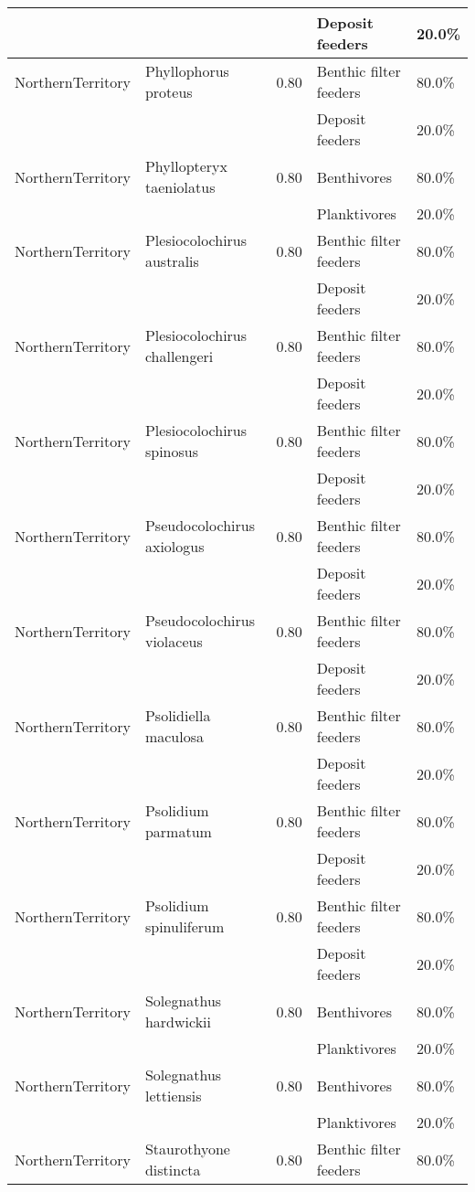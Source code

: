 \begin{longtable}{llcll}
& & & Deposit feeders & 20.0\% \\
\hline
NorthernTerritory & Phyllophorus proteus & 0.80 & Benthic filter feeders & 80.0\% \\
& & & Deposit feeders & 20.0\% \\
\hline
NorthernTerritory & Phyllopteryx taeniolatus & 0.80 & Benthivores & 80.0\% \\
& & & Planktivores & 20.0\% \\
\hline
NorthernTerritory & Plesiocolochirus australis & 0.80 & Benthic filter feeders & 80.0\% \\
& & & Deposit feeders & 20.0\% \\
\hline
NorthernTerritory & Plesiocolochirus challengeri & 0.80 & Benthic filter feeders & 80.0\% \\
& & & Deposit feeders & 20.0\% \\
\hline
NorthernTerritory & Plesiocolochirus spinosus & 0.80 & Benthic filter feeders & 80.0\% \\
& & & Deposit feeders & 20.0\% \\
\hline
NorthernTerritory & Pseudocolochirus axiologus & 0.80 & Benthic filter feeders & 80.0\% \\
& & & Deposit feeders & 20.0\% \\
\hline
NorthernTerritory & Pseudocolochirus violaceus & 0.80 & Benthic filter feeders & 80.0\% \\
& & & Deposit feeders & 20.0\% \\
\hline
NorthernTerritory & Psolidiella maculosa & 0.80 & Benthic filter feeders & 80.0\% \\
& & & Deposit feeders & 20.0\% \\
\hline
NorthernTerritory & Psolidium parmatum & 0.80 & Benthic filter feeders & 80.0\% \\
& & & Deposit feeders & 20.0\% \\
\hline
NorthernTerritory & Psolidium spinuliferum & 0.80 & Benthic filter feeders & 80.0\% \\
& & & Deposit feeders & 20.0\% \\
\hline
NorthernTerritory & Solegnathus hardwickii & 0.80 & Benthivores & 80.0\% \\
& & & Planktivores & 20.0\% \\
\hline
NorthernTerritory & Solegnathus lettiensis & 0.80 & Benthivores & 80.0\% \\
& & & Planktivores & 20.0\% \\
\hline
NorthernTerritory & Staurothyone distincta & 0.80 & Benthic filter feeders & 80.0\% \\

\end{longtable}
